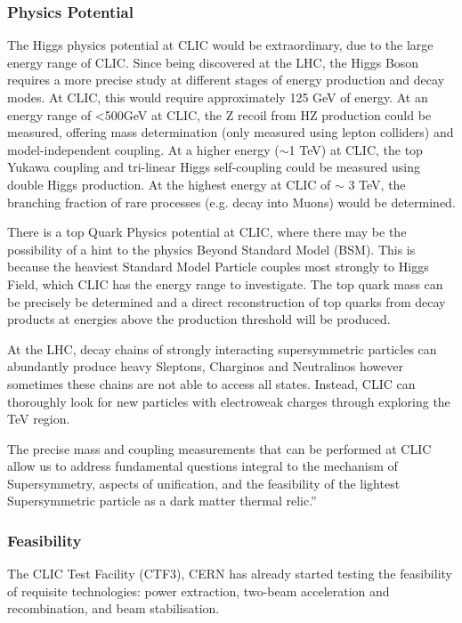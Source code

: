 \subsubsection{Physics Potential}
 
The Higgs physics potential at CLIC would be extraordinary, due to the large energy range of CLIC. Since being discovered at the LHC, the Higgs Boson requires a more precise study at different stages of energy production and decay modes. At CLIC, this would require approximately 125 GeV of energy. At an energy range of <500GeV at CLIC, the Z recoil from HZ production could be measured, offering mass determination (only measured using lepton colliders) and model-independent coupling. At a higher energy ($\sim$1 TeV) at CLIC, the top Yukawa coupling and tri-linear Higgs self-coupling could be measured using double Higgs production.
At the highest energy at CLIC of $\sim$ 3 TeV, the branching fraction of rare processes (e.g. decay into Muons) would be determined.
 
There is a top Quark Physics potential at CLIC, where there may be the possibility of a hint to the physics Beyond Standard Model (BSM). This is because the heaviest Standard Model Particle couples most strongly to Higgs Field, which CLIC has the energy range to investigate. The top quark mass can be precisely be determined and a direct reconstruction of top quarks from decay products at energies above the production threshold will be produced.
 
At the LHC, decay chains of strongly interacting supersymmetric particles can abundantly produce heavy Sleptons, Charginos and Neutralinos however sometimes these chains are not able to access all states. Instead, CLIC can thoroughly look for new particles with electroweak charges through exploring the TeV region. \cite{CLIC:Concept}

The precise mass and coupling measurements that can be performed at CLIC allow us to address fundamental questions integral to the mechanism of Supersymmetry, aspects of unification, and the feasibility of the lightest Supersymmetric particle as a dark matter thermal relic.” \cite{CLIC:Concept}
 
\subsubsection{Feasibility}

The CLIC Test Facility (CTF3), CERN has already started testing the feasibility of requisite technologies: power extraction, two-beam acceleration and recombination, and beam stabilisation. \cite{CLIC:DriveBeam}

